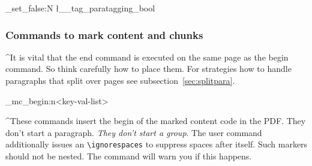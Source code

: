 \documentclass[DIV=12,parskip=half-,bibliography=totoc]{scrartcl}
\newcommand\PDF{PDF}
\newcommand\parataggingOff{\bool_set_false:N \l__tag_paratagging_bool}
\begin{document}
\parataggingOff

\subsubsection{Commands to mark content and chunks}

\TagP^It is vital that the end command is executed on the same page as the begin command. So think carefully how to place them.
For strategies how to handle paragraphs that split over pages see subsection~\ref{sec:splitpara}.\TagPend

\ExplSyntaxOn
\DescribeMacro{}
\DescribeMacro\tag_mc_begin:n{<key-val-list>}
\ExplSyntaxOff

\TagP^These commands insert the begin of the marked content code in the \PDF{}. They don't start a paragraph. \emph{They don't start a group}. The user command additionally issues an \verb+\ignorespaces+ to suppress spaces after itself.
Such markers should not be nested. The command will warn you if this happens.
\end{document}
